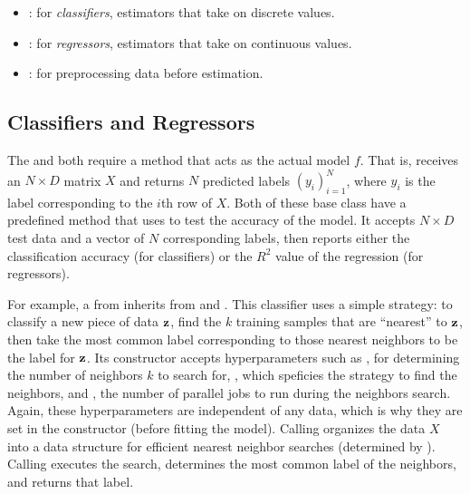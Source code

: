\begin{itemize}
\item {}: for \emph{classifiers}, estimators that take on discrete values.
\item {}: for \emph{regressors}, estimators that take on continuous values.
\item {}: for preprocessing data before estimation.
\end{itemize}

\subsection*{Classifiers and Regressors} %

The  and  both require a  method that acts as the actual model $f$.
That is,  receives an $N\times D$ matrix $X$ and returns $N$ predicted labels $(y_i)_{i=1}^N$, where $y_i$ is the label corresponding to the $i$th row of $X$.
Both of these base class have a predefined  method that uses  to test the accuracy of the model.
It accepts $N\times D$ test data and a vector of $N$ corresponding labels, then reports either the classification accuracy (for classifiers) or the $R^2$ value of the regression (for regressors).

For example, a  from  inherits from  and .
This classifier uses a simple strategy: to classify a new piece of data $\mathbf{z}$, find the $k$ training samples that are ``nearest'' to $\mathbf{z}$, then take the most common label corresponding to those nearest neighbors to be the label for $\mathbf{z}$.
Its constructor accepts hyperparameters such as , for determining the number of neighbors $k$ to search for, , which speficies the strategy to find the neighbors, and , the number of parallel jobs to run during the neighbors search.
Again, these hyperparameters are independent of any data, which is why they are set in the constructor (before fitting the model).
Calling  organizes the data $X$ into a data structure for efficient nearest neighbor searches (determined by ).
Calling  executes the search, determines the most common label of the neighbors, and returns that label.

